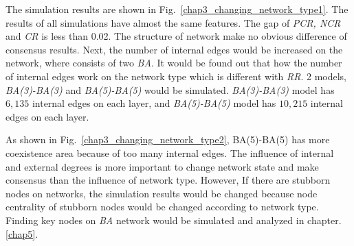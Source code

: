 The simulation results are shown in Fig.~\ref{chap3_changing_network_type1}. The results of all simulations have almost the same features. The gap of \textit{PCR, NCR} and \textit{CR} is less than 0.02. The structure of network make no obvious difference of consensus results. Next, the number of internal edges would be increased on the network, where consists of two \textit{BA}. It would be found out that how the number of internal edges work on the network type which is different with \textit{RR}. 2 models, \textit{BA(3)-BA(3)} and \textit{BA(5)-BA(5)} would be simulated. \textit{BA(3)-BA(3)} model has $6,135$ internal edges on each layer, and \textit{BA(5)-BA(5)} model has $10,215$ internal edges on each layer. 

As shown in Fig.~\ref{chap3_changing_network_type2}, BA(5)-BA(5) has more coexistence area because of too many internal edges. The influence of internal and external degrees is more important to change network state and make consensus than the influence of network type. However, If there are stubborn nodes on networks, the simulation results would be changed because node centrality of stubborn nodes would be changed according to network type. Finding key nodes on \textit{BA} network would be simulated and analyzed in chapter.\ref{chap5}.

